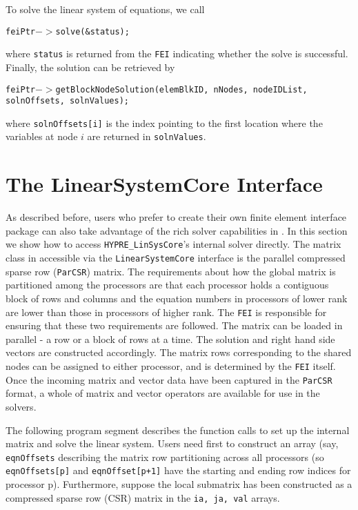 To solve the linear system of equations, we call
\begin{tabbing}
\hspace{0.5in} \= {\tt feiPtr$->$solve(\&status);}
\end{tabbing}
where {\tt status} is returned from the {\tt FEI} indicating whether
the solve is successful. Finally, the solution can be retrieved by
\begin{tabbing}
\hspace{0.5in} \= {\tt feiPtr$->$getBlockNodeSolution(elemBlkID, nNodes, nodeIDList, solnOffsets, solnValues);}
\end{tabbing}
where {\tt solnOffsets[i]} is the index pointing to the first location 
where the variables at node $i$ are returned in {\tt solnValues}.

\section{The LinearSystemCore Interface}
\label{LSI_overview}

As described before, users who prefer to create their own finite element
interface package can also take advantage of the rich solver capabilities
in \hypre{}. In this section we show how to access {\tt HYPRE\_LinSysCore}'s
internal solver directly.  
The matrix class in \hypre{} accessible via the {\tt LinearSystemCore} interface
is the parallel compressed sparse row ({\tt ParCSR}) matrix.  The
requirements about how the global matrix is partitioned among the
processors are that each processor holds a contiguous block of rows and columns
and the equation numbers in processors of lower rank are lower than those
in processors of higher rank.  The {\tt FEI} is responsible for ensuring
that these two requirements are followed. The matrix can be loaded in
parallel - a row or a block of rows at a time.  The solution and right
hand side vectors are constructed accordingly. The matrix rows corresponding
to the shared nodes can be assigned to either processor, and is determined
by the {\tt FEI} itself. Once the incoming matrix and vector data have
been captured in the \hypre{} {\tt ParCSR} format, a whole of matrix and
vector operators are available for use in the \hypre{} solvers.

The following program segment describes the function calls to set up
the internal matrix and solve the linear system.
Users need first to 
construct an array (say, {\tt eqnOffsets} describing the matrix row
partitioning across all processors (so {\tt eqnOffsets[p]} and
{\tt eqnOffset[p+1]} have the starting and ending row indices for processor
p). Furthermore, suppose the local submatrix has been constructed as a
compressed sparse row (CSR) matrix in the {\tt ia, ja, val} arrays. 

